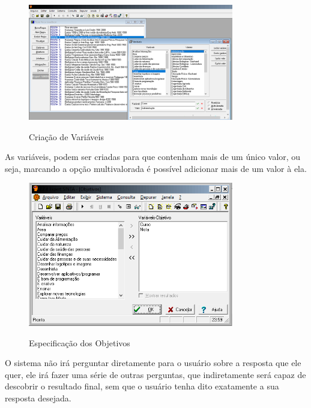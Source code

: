  
 \begin{figure}[H]
    \centering
    \caption{Criação de Variáveis}
    \includegraphics[width=0.8\textwidth]{variaveis.PNG}
    \label{variaveis}
\end{figure}
 As variáveis, podem ser criadas para que contenham mais de um único valor, ou seja, marcando a opção multivalorada é possível adicionar mais de um valor à ela.
 
 
  \begin{figure}[H]
    \centering
    \caption{Especificação dos Objetivos}
    \includegraphics[width=0.8\textwidth]{objetivos.PNG}
    \label{objetivos}
\end{figure}


O sistema não irá perguntar diretamente para o usuário sobre a resposta que ele quer, ele irá fazer uma série de outras perguntas, que indiretamente será capaz de descobrir o resultado final, sem que o usuário tenha dito exatamente a sua resposta desejada.


